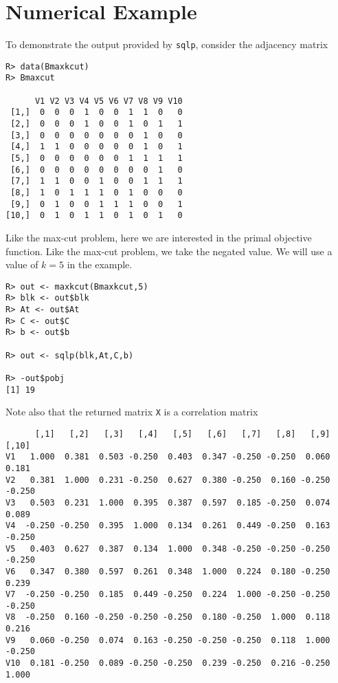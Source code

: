 \documentclass{article}
\begin{document}
\section*{Numerical Example}

To demonstrate the output provided by \verb!sqlp!, consider the adjacency matrix

\begin{verbatim}
R> data(Bmaxkcut)
R> Bmaxcut

      V1 V2 V3 V4 V5 V6 V7 V8 V9 V10
 [1,]  0  0  0  1  0  0  1  1  0   0
 [2,]  0  0  0  1  0  0  1  0  1   1
 [3,]  0  0  0  0  0  0  0  1  0   0
 [4,]  1  1  0  0  0  0  0  1  0   1
 [5,]  0  0  0  0  0  0  1  1  1   1
 [6,]  0  0  0  0  0  0  0  0  1   0
 [7,]  1  1  0  0  1  0  0  1  1   1
 [8,]  1  0  1  1  1  0  1  0  0   0
 [9,]  0  1  0  0  1  1  1  0  0   1
[10,]  0  1  0  1  1  0  1  0  1   0
\end{verbatim}

Like the max-cut problem, here we are interested in the primal objective function. Like the max-cut problem, we take the negated value. We will use a value of $k=5$ in the example.

\begin{verbatim}
R> out <- maxkcut(Bmaxkcut,5)
R> blk <- out$blk
R> At <- out$At
R> C <- out$C
R> b <- out$b

R> out <- sqlp(blk,At,C,b)

R> -out$pobj
[1] 19
\end{verbatim}

Note also that the returned matrix \verb!X! is a correlation matrix

\begin{verbatim}
      [,1]   [,2]   [,3]   [,4]   [,5]   [,6]   [,7]   [,8]   [,9]  [,10]
V1   1.000  0.381  0.503 -0.250  0.403  0.347 -0.250 -0.250  0.060  0.181
V2   0.381  1.000  0.231 -0.250  0.627  0.380 -0.250  0.160 -0.250 -0.250
V3   0.503  0.231  1.000  0.395  0.387  0.597  0.185 -0.250  0.074  0.089
V4  -0.250 -0.250  0.395  1.000  0.134  0.261  0.449 -0.250  0.163 -0.250
V5   0.403  0.627  0.387  0.134  1.000  0.348 -0.250 -0.250 -0.250 -0.250
V6   0.347  0.380  0.597  0.261  0.348  1.000  0.224  0.180 -0.250  0.239
V7  -0.250 -0.250  0.185  0.449 -0.250  0.224  1.000 -0.250 -0.250 -0.250
V8  -0.250  0.160 -0.250 -0.250 -0.250  0.180 -0.250  1.000  0.118  0.216
V9   0.060 -0.250  0.074  0.163 -0.250 -0.250 -0.250  0.118  1.000 -0.250
V10  0.181 -0.250  0.089 -0.250 -0.250  0.239 -0.250  0.216 -0.250  1.000
\end{verbatim}



\end{document}
